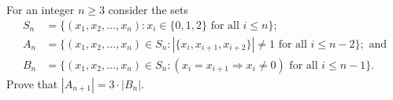 For an integer \(n \ge 3\) consider the sets
\begin{align*}
S_n &= \{ (x_1,x_2,\ldots,x_n) : x_i \in \{0, 1, 2\} \text{ for all } i \le n \}; \\
A_n &= \{(x_1,x_2,\ldots,x_n) \in S_n : |\{x_i, x_{i+1}, x_{i+2}\}| \ne 1 \text{ for all } i \le n - 2\}; \text{ and} \\
B_n &= \{(x_1,x_2,\ldots,x_n) \in S_n : (x_i = x_{i+1} \Rightarrow x_i \ne 0) \text{ for all } i \le n - 1\} .
\end{align*}
Prove that \(|A_{n+1}| = 3 \cdot |B_n|\).